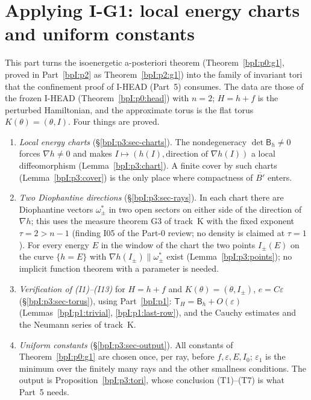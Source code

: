 \section{Applying I-G1: local energy charts and uniform constants}\label{bpI:p3}

This part turns the isoenergetic a-posteriori theorem (Theorem~\ref{bpI:p0:g1}, proved in Part~\ref{bpI:p2} as
Theorem~\ref{bpI:p2:g1}) into the family of invariant tori that the confinement proof of I-HEAD (Part~5)
consumes. The data are those of the frozen I-HEAD (Theorem~\ref{bpI:p0:head}) with $n=2$; $H=h+f$ is the
perturbed Hamiltonian, and the approximate torus is the flat torus $K(\theta)=(\theta,I)$. Four things are proved.
\begin{enumerate}[label=(\arabic*)]
\item \emph{Local energy charts} (\S\ref{bpI:p3:sec-charts}). The nondegeneracy $\det\mathsf B_h\ne0$ forces
  $\nabla h\ne0$ and makes $I\mapsto(h(I),\text{direction of }\nabla h(I))$ a local diffeomorphism
  (Lemma~\ref{bpI:p3:chart}). A finite cover by such charts (Lemma~\ref{bpI:p3:cover}) is the only place where
  compactness of $\overline{B'}$ enters.
\item \emph{Two Diophantine directions} (\S\ref{bpI:p3:sec-rays}). In each chart there are Diophantine vectors
  $\omega^*_\pm$ in two open sectors on either side of the direction of $\nabla h$; this uses the measure theorem G3 of
  track~K with the fixed exponent $\tau=2>n-1$ (finding I05 of the Part-0 review; no density is claimed at $\tau=1$).
  For every energy $E$ in the window of the chart the two points $I_\pm(E)$ on the curve $\{h=E\}$ with
  $\nabla h(I_\pm)\parallel\omega^*_\pm$ exist (Lemma~\ref{bpI:p3:points}); no implicit function theorem with a parameter
  is needed.
\item \emph{Verification of (I1)--(I13)} for $H=h+f$ and $K(\theta)=(\theta,I_\pm)$, $e=C\varepsilon$
  (\S\ref{bpI:p3:sec-torus}), using Part~\ref{bpI:p1}: $\mathsf T_H=\mathsf B_h+O(\varepsilon)$
  (Lemmas~\ref{bpI:p1:trivial}, \ref{bpI:p1:last-row}), and the Cauchy estimates and the Neumann series of track~K.
\item \emph{Uniform constants} (\S\ref{bpI:p3:sec-output}). All constants of Theorem~\ref{bpI:p0:g1} are chosen once, per ray,
  before $f,\varepsilon,E,I_0$; $\varepsilon_1$ is the minimum over the finitely many rays and the other smallness
  conditions. The output is Proposition~\ref{bpI:p3:tori}, whose conclusion (T1)--(T7) is what Part~5 needs.
\end{enumerate}

